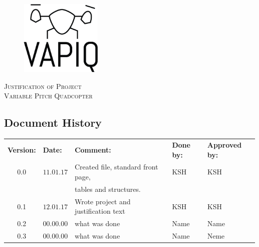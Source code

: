 \documentclass{article}
\author{Tomas Lyngroth \\ Aleksander Holthe \\ Vanja Katinka Halvorsen \\ Stian Fredriksen \\ Kent Kjeldaas \\ Katrine Sundal Haune}
\makeatletter
\let\vapiqteam\@author
\makeatother
\begin{document}
\begin{titlepage}
    \centering
    \pagecolor{gainsboro}
	\\[3.0 cm]
    \begin{figure}[h]
        \centering
        \includegraphics[width = 0.35\textwidth]{VAPIQ-PICTURES//Logo2_Tilted.png}
        \\[2.0 cm] 
    \end{figure}                              
    \textsc{\Huge Justification of Project}  
    \\[1 cm]
    \textsc{\Large Variable Pitch Quadcopter}   
    \\[3.0 cm]
	\large \vapiqteam      
\end{titlepage}
\pagecolor{white}


\begin{center}
\section*{\textbf{Document History}}
\begin{tabular}{cllll}
\rowcolor{cadetgrey}
\textbf{Version:}    &\textbf{Date:} 	 &\textbf{Comment:}    &\textbf{Done by:}   &\textbf{Approved by:}  \\

0.0       & $11.01.17$   & Created file, standard front page, & KSH  & KSH \\
          &              & tables and structures.    &     & \\\rowcolor{gainsboro}
0.1       & $12.01.17$   & Wrote project and justification text & KSH    & KSH          \\
0.2       & $00.00.00$   & what was done  & Name    & Name          \\ \rowcolor{gainsboro}
0.3       & $00.00.00$   & what was done  & Name    & Neme          \\
\end{tabular}                                                                   
\end{center}
\end{document}
